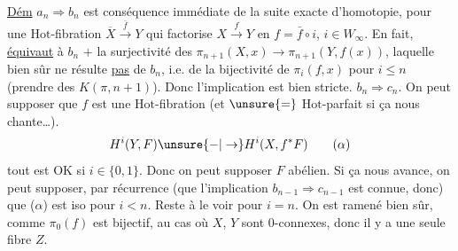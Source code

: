 \uline{Dém} $a_n\Rightarrow b_n$ est conséquence immédiate de la suite exacte d'homotopie, pour une $\mathrm{Hot}$-fibration $\overline X\xrightarrow{\bar f}Y$ qui factorise $X\xrightarrow{f}Y$ en $f=\bar f\circ i$, $i\in W_\infty$. En fait,
 \uline{équivaut} à $b_n$ $+$ la surjectivité des $\pi_{n+1}(X,x)\to\pi_{n+1}(Y,f(x))$, laquelle bien sûr ne résulte \uline{pas} de $b_n$, i.e. de la bijectivité de $\pi_i(f,x)$ pour $i\leq n$ (prendre des $K(\pi,n+1)$). Donc l'implication est bien stricte.
$b_n\Rightarrow c_n$. On peut supposer que $f$ est une $\mathrm{Hot}$-fibration (et $\unsure{=}$ $\mathrm{Hot}$-parfait si ça nous chante\ldots).   
\[
H^i(Y,F)\unsure{-|\to} H^i(X,f^*F)
\tag*{($\alpha$)}
\]
tout est OK si $i\in\{0,1\}$. Donc on peut supposer $F$ abélien. Si ça nous avance, on peut supposer, par récurrence (que l'implication $b_{n-1}\Rightarrow c_{n-1}$ est connue, donc) que ($\alpha$) est iso pour $i<n$. Reste à le voir pour $i=n$.  On est ramené bien sûr, comme $\pi_0(f)$ est bijectif, au cas où $X$, $Y$ sont 0-connexes, donc il y a  une seule fibre $Z$.

